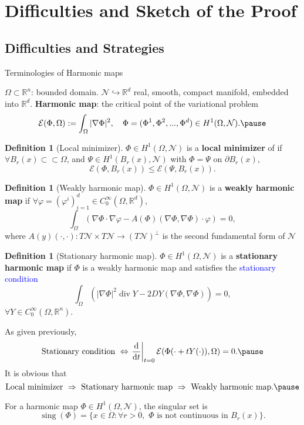 \documentclass[11pt]{beamer}
\newcommand{\om}{\Omega}
\newcommand{\pa}{\partial}
\newcommand{\ud}{\mathrm{d}}
\newcommand{\cE}{\mathcal{E}}
\newcommand{\cN}{\mathcal{N}}
\newcommand{\R}{\mathbb{R}}
\newcommand{\vp}{\varphi}
\newcommand{\ift}{\infty}
\newcommand{\f}{\frac}
\newcommand{\Ra}{\Rightarrow}
\newcommand{\op}{\operatorname}
\newcommand{\na}{\nabla}
\DeclareMathOperator{\sing}{sing}
\theoremstyle{plain}
\theoremstyle{definition}
\newtheorem{defn}[thm]{Definition}
\begin{document}
\section{Difficulties and Sketch of the Proof}

\subsection{Difficulties and Strategies}

\begin{frame}{Terminologies of Harmonic maps}

$ \om\subset\R^n $: bounded domain. $ \cN\hookrightarrow\R^d $ real, smooth, compact manifold, embedded into $ \R^d $. \textbf{Harmonic map}: the critical point of the variational problem
$$
\cE(\Phi,\om):=\int_{\om}|\na\Phi|^2,\quad\Phi=(\Phi^1,\Phi^2,...,\Phi^d)\in H^1(\om,\cN).\pause
$$
\begin{defn}[Local minimizer]
$ \Phi\in H^1(\om,\cN) $ is a \textbf{local minimizer} of if $ \forall B_r(x)\subset\subset\om $, and $ \Psi\in H^1(B_r(x),\cN) $ with $ \Phi=\Psi $ on $ \pa B_r(x) $,
$$
\cE(\Phi,B_r(x))\leq\cE(\Psi,B_r(x)).
$$
\end{defn}\pause

\begin{defn}[Weakly harmonic map]
$ \Phi\in H^1(\om,\cN) $ is a \textbf{weakly harmonic map} if $ \forall\vp=(\vp^i)_{i=1}^d\in C_0^{\ift}(\om,\R^d) $,
$$
\int_{\om}(\na\Phi\cdot\na\vp-A(\Phi)(\na\Phi,\na\Phi)\cdot\vp)=0,
$$
where $ A(y)(\cdot,\cdot):T\cN\times T\cN\to(T\cN)^{\perp} $ is the second fundamental form of $ \cN $
\end{defn}
\end{frame}

\begin{frame}
\begin{defn}[Stationary harmonic map]
$ \Phi\in H^1(\om,\cN) $ is a \textbf{stationary harmonic map} if $ \Phi $ is a weakly harmonic map and satisfies the \textcolor{blue}{stationary condition}
$$
\int_{\om}(|\na\Phi|^2\op{div}Y-2DY(\na\Phi,\na\Phi))=0,
$$
$ \forall Y\in C_0^{\ift}(\om,\R^n) $.
\end{defn}\pause

As given previously,
$$
\text{Stationary condition }\Leftrightarrow\left.\f{\ud}{\ud t}\right|_{t=0}\cE(\Phi(\cdot+tY(\cdot)),\om)=0.\pause
$$
It is obvious that
$$
\text{Local minimizer}\,\,\Ra\,\,\text{Stationary harmonic map}\,\,\Ra\,\,\text{Weakly harmonic map}.\pause
$$



For a harmonic map $ \Phi\in H^1(\om,\cN) $, the singular set is
$$
\sing(\Phi)=\{x\in\om:\forall r>0,\,\,\Phi\text{ is not continuous in }B_r(x)\}.
$$

\end{frame}
\end{document}
